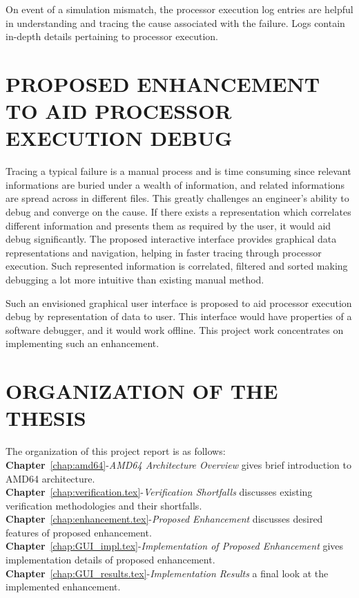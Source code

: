 On event of a simulation mismatch, the processor execution log entries are helpful in understanding and tracing the cause associated with the failure. Logs contain in-depth details pertaining to processor execution. 

\section{PROPOSED ENHANCEMENT TO AID PROCESSOR EXECUTION DEBUG}
Tracing a typical failure is a manual process and is time consuming since relevant informations are buried under a wealth of information, and related informations are spread across in different files. This greatly challenges an engineer's ability to debug and converge on the cause. If there exists a representation which correlates different information and presents them as required by the user, it would aid debug significantly. The proposed interactive interface provides graphical data representations and navigation, helping in faster tracing through processor execution. Such represented information is correlated, filtered and sorted making debugging a lot more intuitive than existing manual method.


Such an envisioned graphical user interface is proposed to aid processor execution debug by representation of data to user. This interface would have properties of a software debugger, and it would work offline. This project work concentrates on implementing such an enhancement.

 


\section{ORGANIZATION OF THE THESIS}
The organization of this project report is as follows:\\
\noindent 
{\bf Chapter}~\ref{chap:amd64}-{\it AMD64 Architecture Overview} gives brief introduction to AMD64 architecture.\\
{\bf Chapter}~\ref{chap:verification.tex}-{\it Verification Shortfalls} discusses existing verification methodologies and their shortfalls.\\
{\bf Chapter}~\ref{chap:enhancement.tex}-{\it Proposed Enhancement} discusses desired features of proposed enhancement.\\
{\bf Chapter}~\ref{chap:GUI_impl.tex}-{\it Implementation of Proposed Enhancement} gives implementation details of proposed enhancement.\\
{\bf Chapter}~\ref{chap:GUI_results.tex}-{\it Implementation Results} a final look at the implemented enhancement.\\


